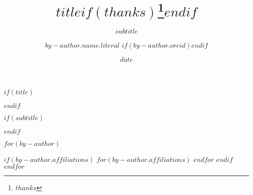 $if(title)$
\title{$title$$if(thanks)$\thanks{$thanks$}$endif$}
$endif$

$if(subtitle)$
\subtitle{$subtitle$}
$endif$

$for(by-author)$
  \author{$by-author.name.literal$
  $if(by-author.orcid)$$endif$}
  $if(by-author.affiliations)$
    $for(by-author.affiliations)$
    $endfor$
  $endif$
$endfor$

\date{$date$}
